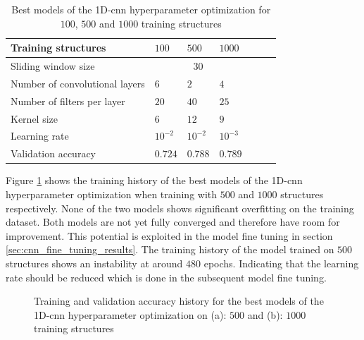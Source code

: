 \documentclass[conference]{IEEEtran}
\begin{document}
\begin{table}[htp]
	\centering
	\caption{Best models of the 1D-\gls{cnn} hyperparameter optimization for $ 100 $, $ 500 $ and $ 1000 $ training structures}
	\label{tab:hyperparameters_100_500_1000_structures_CNN}
	\begin{tabular}{p{2.5cm}|llllll}
		Training structures & $ 100 $ & $ 500 $ & $ 1000 $ \\
		\hline
		Sliding window size & \multicolumn{3}{c}{$ 30 $} \\
		\hline
		Number of convolutional layers & $ 6 $ & $ 2 $ & $ 4 $ \\
		Number of filters per layer & $ 20 $ & $ 40 $ & $ 25 $ \\
		Kernel size & $ 6 $ & $ 12 $ & $ 9 $ \\
		Learning rate & $ 10^{-2} $ & $ 10^{-2} $ & $ 10^{-3} $ \\
		\hline
		Validation accuracy & $ 0.724 $ & $ 0.788 $ & $ 0.789 $
	\end{tabular}
\end{table}

Figure \ref{fig:accuracy_500_1000_structures_random_search_CNN} shows the training history of the best models of the 1D-\gls{cnn} hyperparameter optimization when training with $ 500 $ and $ 1000 $ structures respectively. None of the two models shows significant overfitting on the training dataset. Both models are not yet fully converged and therefore have room for improvement. This potential is exploited in the model fine tuning in section \ref{sec:cnn_fine_tuning_results}. The training history of the model trained on $ 500 $ structures shows an instability at around $ 480 $ epochs. Indicating that the learning rate should be reduced which is done in the subsequent model fine tuning.

\begin{figure}[htp]
	\centering
	\quad
	\caption{Training and validation accuracy history for the best models of the 1D-\gls{cnn} hyperparameter optimization on (a): $ 500 $ and (b): $ 1000 $ training structures}
	\label{fig:accuracy_500_1000_structures_random_search_CNN}
\end{figure}
\end{document}
